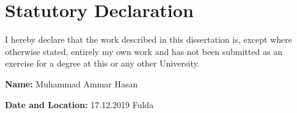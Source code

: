 \chapter*{Statutory Declaration}

I hereby declare that the work described in this dissertation is, except where otherwise stated, entirely my own work and has not been submitted as an exercise for a degree at this or any other University.



\vspace{5cm}

\textbf{Name: } Muhammad Ammar Hasan

\vspace{2cm}

\textbf{Date and Location: } 17.12.2019 Fulda 
